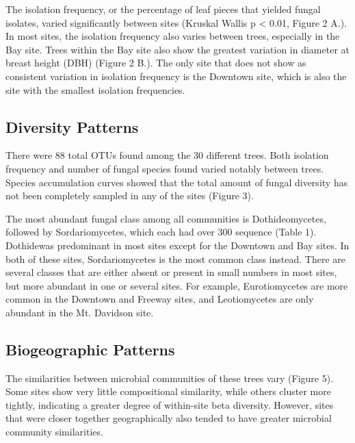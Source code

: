 \documentclass[fleqn,10pt,lineno]{wlpeerj} %
\begin{document}
The isolation frequency, or the percentage of leaf pieces that yielded fungal isolates, varied significantly between sites (Kruskal Wallis p \textless{} 0.01, Figure 2 A.). In most sites, the isolation frequency also varies between trees, especially in the Bay site. Trees within the Bay site also show the greatest variation in diameter at breast height (DBH) (Figure 2 B.). The only site that does not show as consistent variation in isolation frequency is the Downtown site, which is also the site with the smallest isolation frequencies.

\hypertarget{diversity-patterns}{%
\subsection*{Diversity Patterns}\label{diversity-patterns}}

There were 88 total OTUs found among the 30 different trees. Both isolation frequency and number of fungal species found varied notably between trees. Species accumulation curves showed that the total amount of fungal diversity has not been completely sampled in any of the sites (Figure 3).

The most abundant fungal class among all communities is Dothideomycetes, followed by Sordariomycetes, which each had over 300 sequence (Table 1). Dothidewas predominant in most sites except for the Downtown and Bay sites. In both of these sites, Sordariomycetes is the most common class instead. There are several classes that are either absent or present in small numbers in most sites, but more abundant in one or several sites. For example, Eurotiomycetes are more common in the Downtown and Freeway sites, and Leotiomycetes are only abundant in the Mt. Davidson site.

\hypertarget{biogeographic-patterns}{%
\subsection*{Biogeographic Patterns}\label{biogeographic-patterns}}

The similarities between microbial communities of these trees vary (Figure 5). Some sites show very little compositional similarity, while others cluster more tightly, indicating a greater degree of within-site beta diversity. However, sites that were closer together geographically also tended to have greater microbial community similarities.
\end{document}
